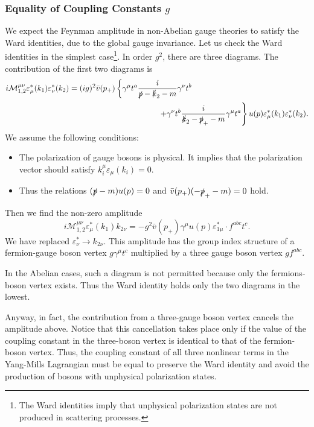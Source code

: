 \documentclass[a4paper,pdftex]{article}
\begin{document}
\subsubsection*{Equality of Coupling Constants $g$}

We expect the Feynman amplitude in non-Abelian gauge theories to satisfy the Ward identities, due to the global gauge invariance. Let us check the Ward identities in the simplest case\footnote{
  The Ward identities imply that unphysical polarization states are not produced in scattering processes.
}. In order $g^2$, there are three diagrams. The contribution of the first two diagrams is 
\begin{align}
  i\mathcal{M}_{1,2}^{\mu\nu}\varepsilon_{\mu}^{\ast}(k_{1})\varepsilon_{\nu}^{\ast}(k_{2})
  &=
  (i g)^2 \bar{v}(p_{+})
  \left\{
    \gamma^{\mu}t^{a}\frac{i}{\slashed{p}-\slashed{k}_{2}-m}\gamma^{\nu}t^{b} 
  \right.
  \nonumber
  \\
  &\hspace*{4cm}
  \left.
    +
    \gamma^{\nu}t^{b}
    \frac{i}{\slashed{k}_{2}-\slashed{p}_{+}-m}
    \gamma^{\mu}t^{a}
  \right\}
  u(p)\varepsilon_{\mu}^{\ast}(k_{1})\varepsilon_{\nu}^{\ast}(k_2)
  .
\end{align}
We assume the following conditions:
\begin{itemize}
  \item 
  The polarization of gauge bosons is physical. It implies that the polarization vector should satisfy $k_{i}^{\mu}\varepsilon_{\mu}(k_{i})=0$.
  \item 
  Thus the relations $(\slashed{p}-m)u(p)=0$ and $\bar{v}(p_{+})(-\slashed{p}_{+}-m)=0$ hold.
\end{itemize}
Then we find the non-zero amplitude
\begin{equation}
  i\mathcal{M}_{1,2}^{\mu\nu}\varepsilon_{\mu}^{\ast}(k_{1})k_{2\nu}
  =
  -g^2\bar{v}(p_{+})\gamma^{\mu}u(p)\varepsilon_{1\mu}^{\ast}
  \cdot
  f^{abc}t^{c}
  .
\end{equation}
We have replaced $\varepsilon_{\nu}^{\ast}\rightarrow k_{2\nu}$. This amplitude has the group index structure of a fermion-gauge boson vertex $g\gamma^{\mu}t^{c}$ multiplied by a three gauge boson vertex $gf^{abc}$. 

In the Abelian cases, such a diagram is not permitted because only the fermions-boson vertex exists. Thus the Ward identity holds only the two diagrams in the lowest.

Anyway, in fact, the contribution from a three-gauge boson vertex cancels the amplitude above. Notice that this cancellation takes place only if the value of the coupling constant in the three-boson vertex is identical to that of the fermion-boson vertex. Thus, the coupling constant of all three nonlinear terms in the Yang-Mills Lagrangian must be equal to preserve the Ward identity and avoid the production of bosons with unphysical polarization states.
\end{document}
